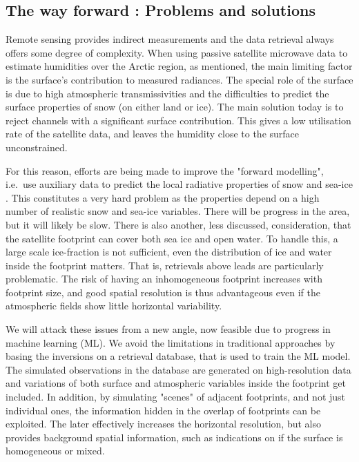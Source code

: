 \documentclass[12pt,oneside,a4paper]{article}
\begin{document}
\subsection{The way forward : Problems and solutions }


Remote sensing provides indirect measurements and the data retrieval always
offers some degree of complexity. When using passive satellite microwave data
to estimate humidities over the Arctic region, as mentioned, the main
limiting factor is the surface's contribution to measured radiances. The
special role of the surface is due to high atmospheric transmissivities and the
difficulties to predict the surface properties of snow (on either land or ice).
The main solution today is to reject channels with a significant surface
contribution. This gives a low utilisation rate of the satellite data, and
leaves the humidity close to the surface unconstrained.

For this reason, efforts are being made to improve the "forward modelling",
i.e.\ use auxiliary data to predict the local radiative properties of snow and sea-ice \citep[e.g.][]{tonboe:2010:thesi}. This constitutes a very hard problem as the properties depend on a high number of realistic snow and sea-ice variables. There will be progress in the area, but it will likely be slow. There is also another, less discussed, consideration, that the satellite footprint can cover both sea ice and open water. To handle this, a large scale ice-fraction is not sufficient, even the distribution of ice and water inside the footprint matters. That is, retrievals above leads are particularly
problematic. The risk of having an inhomogeneous footprint increases with
footprint size, and good spatial resolution is thus advantageous even if the
atmospheric fields show little horizontal variability.



We will attack these issues from a new angle, now feasible due to progress in
machine learning (ML). We avoid the limitations in traditional approaches by
basing the inversions on a retrieval database, that is used to train the ML
model. The simulated observations in the database are generated on
high-resolution data and variations of both surface and atmospheric variables
inside the footprint get included. In addition, by simulating "scenes" of
adjacent footprints, and not just individual ones, the information hidden in
the overlap of footprints can be exploited. The later effectively increases the
horizontal resolution, but also provides background spatial information, such
as indications on if the surface is homogeneous or mixed.
\end{document}
